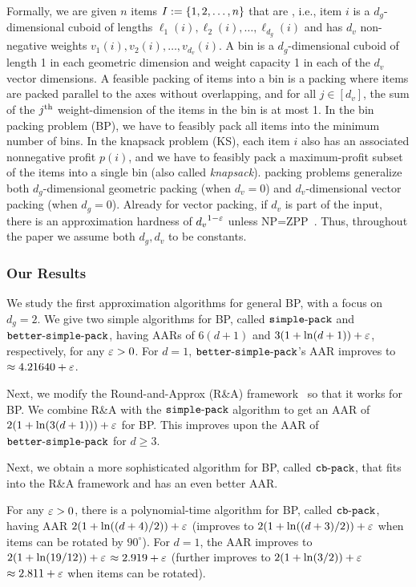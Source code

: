 Formally, we are given $n$ items $I:=\{1, 2, \dots, n\}$
that are , i.e., item $i$ is a
$d_g$-dimensional cuboid of lengths $\ell_1(i), \ell_2(i), \ldots, \ell_{d_g}(i)$
and has $d_v$ non-negative weights $v_1(i), v_2(i), \ldots, v_{d_v}(i)$.
A  bin is a $d_g$-dimensional cuboid of length 1
in each geometric dimension and weight capacity 1 in each of the $d_v$ vector dimensions.
A feasible packing of items into a bin is a packing where items are packed parallel to the axes
without overlapping, and for all $j \in [d_v]$,
the sum of the $j^{\textrm{th}}$ weight-dimension of the items in the bin is at most 1.
In the  bin packing problem (BP),
we have to feasibly pack all items into the minimum number of bins.
In the  knapsack problem (KS),
each item $i$ also has an associated nonnegative profit $p(i)$,
and we have to feasibly pack a maximum-profit subset of the items into a single bin
(also called \emph{knapsack}).
 packing problems generalize both $d_g$-dimensional geometric packing
(when $d_v=0$) and $d_v$-dimensional vector packing (when $d_g=0$).
Already for vector packing, if $d_v$ is part of the input, there is an approximation
hardness of ${d_v}^{1-\varepsilon}$ unless NP=ZPP~\cite{bansal2016improved}.
Thus, throughout the paper we assume both $d_g, d_v$ to be constants.

\subsubsection{Our Results}

We study the first approximation algorithms for general  BP,
with a focus on $d_g = 2$.
We give two simple algorithms for  BP, called $\operatorname{\mathtt{simple-pack}}$
and $\operatorname{\mathtt{better-simple-pack}}$, having AARs of $6(d+1)$ and $3(1+\ln(d+1))+\varepsilon$,
respectively, for any $\varepsilon > 0$.
For $d = 1$, $\operatorname{\mathtt{better-simple-pack}}$'s AAR improves to $\approx 4.21640 + \varepsilon$.

Next, we modify the Round-and-Approx (R\&A) framework~\cite{rna,bansal2014binpacking}
so that it works for  BP.
We combine R\&A with the $\operatorname{\mathtt{simple-pack}}$ algorithm to get an AAR of
$2(1 + \ln(3(d+1))) + \varepsilon$ for  BP.
This improves upon the AAR of $\operatorname{\mathtt{better-simple-pack}}$ for $d \ge 3$.

Next, we obtain a more sophisticated algorithm for  BP, called $\operatorname{\mathtt{cb-pack}}$,
that fits into the R\&A framework and has an even better AAR.
\begin{theorem}
\label{thm:2-d-gvbp}
For any $\varepsilon > 0$, there is a polynomial-time algorithm for  BP,
called $\operatorname{\mathtt{cb-pack}}$, having AAR $2(1+\ln((d+4)/2))+\varepsilon$
(improves to $2(1+\ln((d+3)/2))+\varepsilon$ when items can be rotated by $90^{\circ}$).
For $d=1$, the AAR improves to $2(1+\ln(19/12))+\varepsilon$ $\approx 2.919 + \varepsilon$
(further improves to $2(1+\ln(3/2))+\varepsilon$ $\approx 2.811 + \varepsilon$ when items can be rotated).
\end{theorem}

